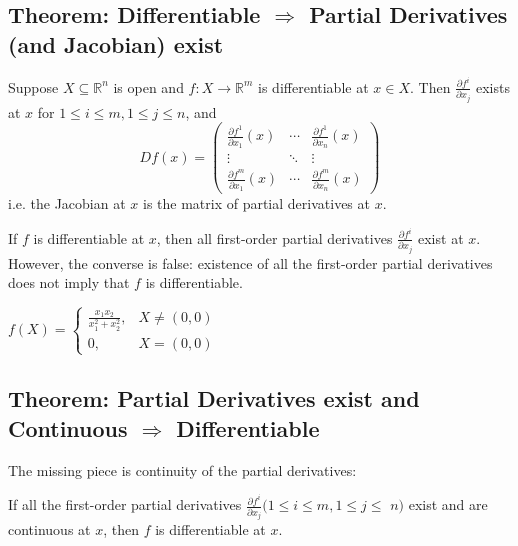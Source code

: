 \documentclass[11pt]{elegantbook}
\begin{document}
\subsection{Theorem: Differentiable $\Rightarrow$ Partial Derivatives (and Jacobian) exist}
\begin{theorem}
    Suppose $X \subseteq \mathbb{R}^n$ is open and $f: X \rightarrow \mathbb{R}^m$ is differentiable at $x \in X$. Then $\frac{\partial f^i}{\partial x_j}$ exists at $x$ for $1 \leq i \leq m, 1 \leq j \leq n$, and
    $$
    D f(x)=\left(\begin{array}{ccc}
    \frac{\partial f^1}{\partial x_1}(x) & \cdots & \frac{\partial f^1}{\partial x_n}(x) \\
    \vdots & \ddots & \vdots \\
    \frac{\partial f^m}{\partial x_1}(x) & \cdots & \frac{\partial f^m}{\partial x_n}(x)
    \end{array}\right)
    $$
    i.e. the Jacobian at $x$ is the matrix of partial derivatives at $x$.
\end{theorem}
\begin{note}
    If $f$ is differentiable at $x$, then all first-order partial derivatives $\frac{\partial f^i}{\partial x_j}$ exist at $x$. However, the converse is false: existence of all the first-order partial derivatives does not imply that $f$ is differentiable.
\end{note}
\begin{example}
    $f(X)=\left\{\begin{matrix}
        \frac{x_1x_2}{x_1^2+x_2^2},&X\neq (0,0)\\
        0,& X=(0,0)
    \end{matrix}\right.$
\end{example}

\subsection{Theorem: Partial Derivatives exist and Continuous $\Rightarrow$ Differentiable}
The missing piece is continuity of the partial derivatives:
\begin{theorem}
    If all the first-order partial derivatives $\frac{\partial f^i}{\partial x_j}(1 \leq i \leq m, 1 \leq j \leq$ $n)$ exist and are continuous at $x$, then $f$ is differentiable at $x$.
\end{theorem}
\end{document}
